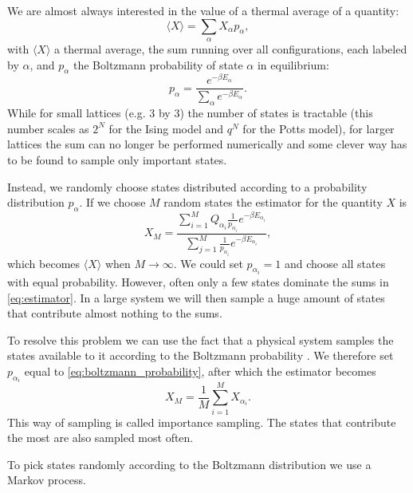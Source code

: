 \documentclass[11pt, a4paper]{report} %
\begin{document}
We are almost always interested in the value of a thermal average of a quantity:
\begin{equation}
	\langle X \rangle = \sum_{\alpha}X_{\alpha}p_{\alpha},
\end{equation}
with \(\langle X \rangle\) a thermal average, the sum running over all configurations, each labeled by \(\alpha\), and \(p_{\alpha}\) the Boltzmann probability of state \(\alpha\) in equilibrium\cite{binney:1992}:
\begin{equation} \label{eq:boltzmann_probability}
	p_{\alpha} = \frac{e^{-\beta E_{\alpha}}}{\sum_{\alpha}e^{-\beta E_{\alpha}}}.
\end{equation}
While for small lattices (e.g. 3 by 3) the number of states is tractable (this number scales as \(2^{N}\) for the Ising model and \(q^{N}\) for the Potts model), for larger lattices the sum can no longer be performed numerically and some clever way has to be found to sample only important states.

Instead, we randomly choose states distributed according to a probability distribution \(p_{\alpha}\).
If we choose \(M\) random states the estimator for the quantity \(X\) is
\begin{equation} \label{eq:estimator}
	X_M = \frac{\sum_{i=1}^M Q_{\alpha_i}\frac{1}{p_{\alpha_i}}e^{-\beta E_{\alpha_i}}}{\sum_{j=1}^M \frac{1}{p_{\alpha_i}} e^{-\beta E_{\alpha_i}}},
\end{equation}
which becomes \(\langle X \rangle\) when \(M \to \infty\).
We could set \(p_{\alpha_i}=1\) and choose all states with equal probability.
However, often only a few states dominate the sums in \cref{eq:estimator}.
In a large system we will then sample a huge amount of states that contribute almost nothing to the sums.

To resolve this problem we can use the fact that a physical system samples the states available to it according to the Boltzmann probability .
We therefore set \(p_{\alpha_i}\) equal to \cref{eq:boltzmann_probability}, after which the estimator becomes
\begin{equation}
	X_M = \frac{1}{M} \sum_{i=1}^M X_{\alpha_i}.
\end{equation}
This way of sampling is called importance sampling. The states that contribute the most are also sampled most often.

To pick states randomly according to the Boltzmann distribution we use a Markov process.
\end{document}
